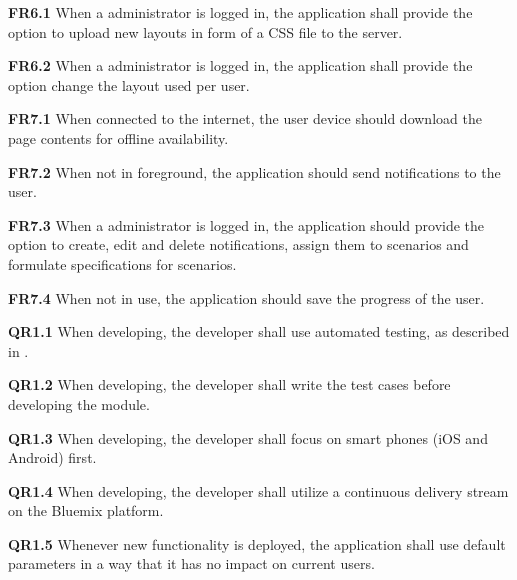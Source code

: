 \begin{closeItem}
      \item [\textbf{FR6.1}] When a administrator is logged in, the application shall provide the option to upload new layouts in form of a CSS file to the server.
     \item [\textbf{FR6.2}] When a administrator is logged in, the application shall provide the option change the layout used per user.
\end{closeItem}

\begin{closeItem}
      \item [\textbf{FR7.1}] When connected to the internet, the user device should download the page contents for offline availability.
      \item [\textbf{FR7.2}] When not in foreground, the application should send notifications to the user.
      \item [\textbf{FR7.3}] When a administrator is logged in, the application should provide the option to create, edit and delete notifications, assign them to scenarios and formulate specifications for scenarios.
      \item [\textbf{FR7.4}] When not in use, the application should save the progress of the user.
      
\end{closeItem}

\begin{closeItem}
     
\end{closeItem}

\begin{closeItem}
      \item [\textbf{QR1.1}] When developing, the developer shall use automated testing, as described in .
      \item [\textbf{QR1.2}] When developing, the developer shall write the test cases before developing the module.
      \item [\textbf{QR1.3}] When developing, the developer shall focus on smart phones (iOS and Android) first.
      \item [\textbf{QR1.4}] When developing, the developer shall utilize a continuous delivery stream on the Bluemix platform. \item [\textbf{QR1.5}] Whenever new functionality is deployed, the application shall use default parameters in a way that it has no impact on current users.
\end{closeItem}

